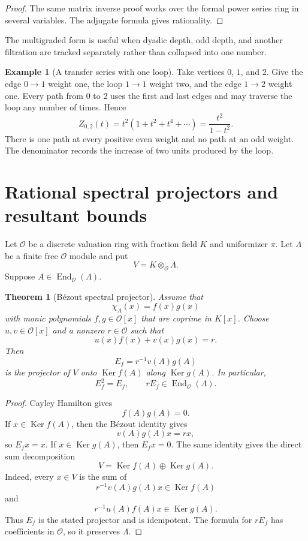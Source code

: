 \documentclass{aomart}
\newtheorem{theorem}{Theorem}[section]
\theoremstyle{definition}
\newtheorem{example}[example]{Example}
\theoremstyle{remark}
\newcommand{\OO}{\mathcal O}
\newcommand{\End}{\operatorname{End}}
\newcommand{\Ker}{\operatorname{Ker}}
\begin{document}
\begin{proof}
The same matrix inverse proof works over the formal power series ring in several variables.  The adjugate formula gives rationality.
\end{proof}

The multigraded form is useful when dyadic depth, odd depth, and another filtration are tracked separately rather than collapsed into one number.

\begin{example}[A transfer series with one loop]\label{ex:simple_transfer_series}
Take vertices $0$, $1$, and $2$.  Give the edge $0\to1$ weight one, the loop $1\to1$ weight two, and the edge $1\to2$ weight one.  Every path from $0$ to $2$ uses the first and last edges and may traverse the loop any number of times.  Hence
\[
Z_{0,2}(t)
=
t^2(1+t^2+t^4+\cdots)
=
\frac{t^2}{1-t^2}.
\]
There is one path at every positive even weight and no path at an odd weight.  The denominator records the increase of two units produced by the loop.
\end{example}

\section{Rational spectral projectors and resultant bounds}\label{sec:resultant}

Let $\OO$ be a discrete valuation ring with fraction field $K$ and uniformizer $\pi$.  Let $\Lambda$ be a finite free $\OO$ module and put
\[
V=K\otimes_{\OO}\Lambda.
\]
Suppose $A\in\End_{\OO}(\Lambda)$.

\begin{theorem}[Bézout spectral projector]\label{thm:bezout_projector}
Assume that
\[
\chi_A(x)=f(x)g(x)
\]
with monic polynomials $f,g\in\OO[x]$ that are coprime in $K[x]$.  Choose $u,v\in\OO[x]$ and a nonzero $r\in\OO$ such that
\[
u(x)f(x)+v(x)g(x)=r.
\]
Then
\[
E_f=r^{-1}v(A)g(A)
\]
is the projector of $V$ onto $\Ker f(A)$ along $\Ker g(A)$.  In particular,
\[
E_f^2=E_f,
\qquad
rE_f\in\End_{\OO}(\Lambda).
\]
\end{theorem}

\begin{proof}
Cayley Hamilton gives
\[
f(A)g(A)=0.
\]
If $x\in\Ker f(A)$, then the Bézout identity gives
\[
v(A)g(A)x=rx,
\]
so $E_fx=x$.  If $x\in\Ker g(A)$, then $E_fx=0$.  The same identity gives the direct sum decomposition
\[
V=\Ker f(A)\oplus\Ker g(A).
\]
Indeed, every $x\in V$ is the sum of
\[
r^{-1}v(A)g(A)x\in\Ker f(A)
\]
and
\[
r^{-1}u(A)f(A)x\in\Ker g(A).
\]
Thus $E_f$ is the stated projector and is idempotent.  The formula for $rE_f$ has coefficients in $\OO$, so it preserves $\Lambda$.
\end{proof}
\end{document}
